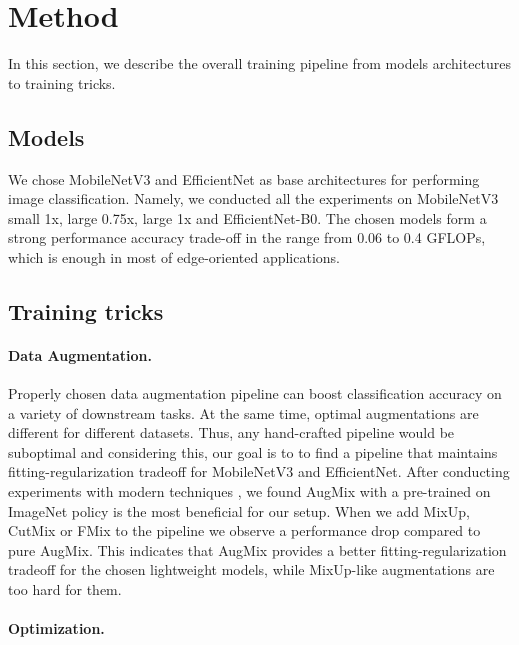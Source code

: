 \documentclass[runningheads]{llncs}
\begin{document}
\section{Method}
In this section, we describe the overall training pipeline from models architectures to training tricks.

\subsection{Models}
We chose MobileNetV3 \cite{Howard2019SearchingFM} and EfficientNet \cite{Tan2019EfficientNetRM}
as base architectures for performing image classification.
Namely, we conducted all the experiments on MobileNetV3 small 1x, large 0.75x, large 1x and EfficientNet-B0.
The chosen models form a strong performance accuracy trade-off in the range from 0.06 to 0.4 GFLOPs, which is
enough in most of edge-oriented applications.

\subsection{Training tricks}
\label{subsec:tricks}

\paragraph{Data Augmentation.}

Properly chosen data augmentation pipeline can boost classification accuracy on a variety of downstream tasks.
At the same time, optimal augmentations are different for different datasets. Thus, any hand-crafted pipeline
would be suboptimal and considering this, our goal is to to find a pipeline that maintains fitting-regularization tradeoff for
MobileNetV3 and EfficientNet.
After conducting experiments with modern techniques \cite{hendrycks2020augmix,Zhang2018mixupBE,Yun2019CutMixRS,Harris2020FMixEM}, we found
AugMix\cite{hendrycks2020augmix} with a pre-trained on ImageNet policy is the most beneficial for our setup. When we add
MixUp\cite{Zhang2018mixupBE}, CutMix\cite{Yun2019CutMixRS} or FMix\cite{Harris2020FMixEM} to the pipeline
we observe a performance drop compared to pure AugMix. This indicates that AugMix provides a better
fitting-regularization tradeoff for the chosen lightweight models, while MixUp-like augmentations
are too hard for them.

\paragraph{Optimization.}
\end{document}
